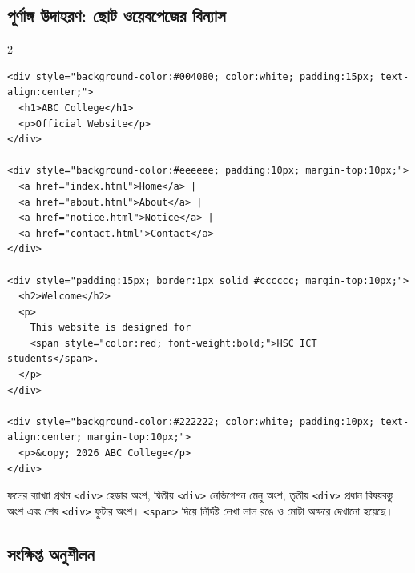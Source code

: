 

\subsection{পূর্ণাঙ্গ উদাহরণ: ছোট ওয়েবপেজের বিন্যাস}

\par{}\par
\begin{multicols}{2}
\begin{verbatim}
<div style="background-color:#004080; color:white; padding:15px; text-align:center;">
  <h1>ABC College</h1>
  <p>Official Website</p>
</div>

<div style="background-color:#eeeeee; padding:10px; margin-top:10px;">
  <a href="index.html">Home</a> |
  <a href="about.html">About</a> |
  <a href="notice.html">Notice</a> |
  <a href="contact.html">Contact</a>
</div>

<div style="padding:15px; border:1px solid #cccccc; margin-top:10px;">
  <h2>Welcome</h2>
  <p>
    This website is designed for
    <span style="color:red; font-weight:bold;">HSC ICT students</span>.
  </p>
</div>

<div style="background-color:#222222; color:white; padding:10px; text-align:center; margin-top:10px;">
  <p>&copy; 2026 ABC College</p>
</div>
\end{verbatim}
\end{multicols}


\begin{examplebox}{ফলের ব্যাখ্যা}
প্রথম \texttt{<div>} হেডার অংশ, দ্বিতীয় \texttt{<div>} নেভিগেশন মেনু অংশ, তৃতীয় \texttt{<div>} প্রধান বিষয়বস্তু অংশ এবং শেষ \texttt{<div>} ফুটার অংশ। \texttt{<span>} দিয়ে নির্দিষ্ট লেখা লাল রঙে ও মোটা অক্ষরে দেখানো হয়েছে।
\end{examplebox}


\subsection{সংক্ষিপ্ত অনুশীলন}

